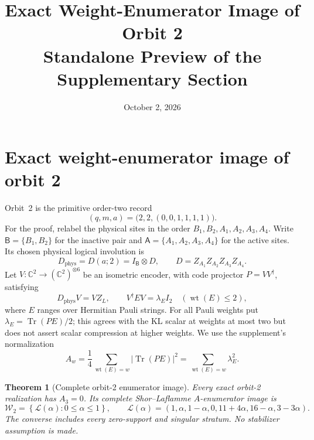 \documentclass[11pt]{article}
\title{Exact Weight-Enumerator Image of Orbit 2\\
\large Standalone Preview of the Supplementary Section}
\author{}
\date{October 2, 2026}
\newcommand{\C}{\mathbb C}
\newcommand{\wt}{\operatorname{wt}}
\newtheorem{theorem}{Theorem}[section]
\theoremstyle{definition}
\begin{document}
\maketitle
% 

\section{Exact weight-enumerator image of orbit 2}
\label{o2gc:sec}

Orbit~2 is the primitive order-two record
\[
 (q,m,a)=\bigl(2,2,(0,0,1,1,1,1)\bigr).
\]
For the proof, relabel the physical sites in the order
\(B_1,B_2,A_1,A_2,A_3,A_4\). Write
\(\mathsf B=\{B_1,B_2\}\) for the inactive pair and
\(\mathsf A=\{A_1,A_2,A_3,A_4\}\) for the active sites. Its chosen physical
logical involution is
\begin{equation}
 D_{\mathrm{phys}}=D(a;2)=I_{\mathsf B}\otimes D,
 \qquad D=Z_{A_1}Z_{A_2}Z_{A_3}Z_{A_4}.
 \label{o2gc:record}
\end{equation}
Let \(V:\C^2\to(\C^2)^{\otimes6}\) be an isometric encoder, with
code projector \(P=VV^\dagger\), satisfying
\begin{equation}
 D_{\mathrm{phys}}V=VZ_L,\qquad
 V^\dagger EV=\lambda_EI_2\quad(\wt(E)\le2),
 \label{o2gc:KL}
\end{equation}
where \(E\) ranges over Hermitian Pauli strings. For all Pauli weights
put \(\lambda_E=\operatorname{Tr}(PE)/2\); this agrees with the KL scalar
at weights at most two but does not assert scalar compression at higher
weights. We use the supplement's normalization
\[
 A_w=\frac14\sum_{\wt(E)=w}|\operatorname{Tr}(PE)|^2
     =\sum_{\wt(E)=w}\lambda_E^2.
\]

\begin{theorem}[Complete orbit-2 enumerator image]
\label{o2gc:thm-image}
Every exact orbit-2 realization has \(A_3=0\). Its complete
Shor--Laflamme \(A\)-enumerator image is
\begin{equation}
 \boxed{
 \mathcal W_2=
 \left\{\mathcal L(\alpha):0\le\alpha\le1\right\},
 \qquad
 \mathcal L(\alpha)=
 (1,\alpha,1-\alpha,0,11+4\alpha,16-\alpha,3-3\alpha).
 }
 \label{o2gc:image}
\end{equation}
The converse includes every zero-support and singular stratum. No
stabilizer assumption is made.
\end{theorem}
\end{document}

